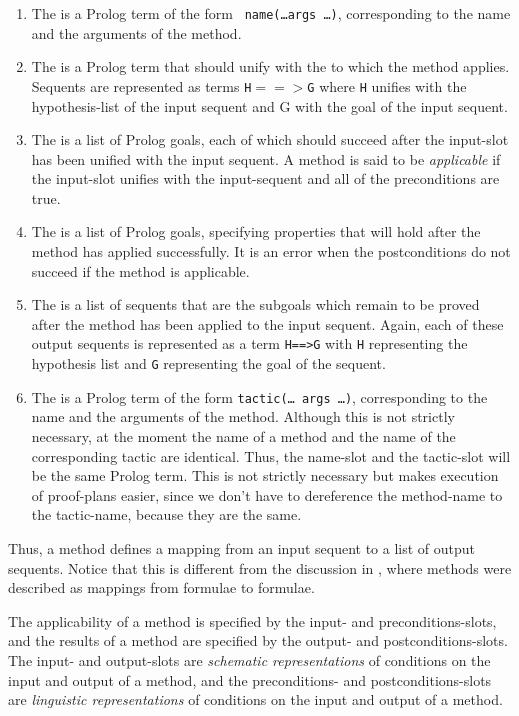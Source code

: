 \begin{enumerate}
\item
The {\em {}\/} is a Prolog term of the form {\tt
name(\ldots args \ldots)}, corresponding to the name and the arguments
of the method.
\item
The  is a Prolog term that should unify with the
 to which the method applies. Sequents are represented as
terms {\tt H$==>$G} where {\tt H} unifies with the hypothesis-list of
the input sequent and G with the goal of the input sequent.
\item
The  is a list of Prolog goals, each of which
should succeed after the input-slot has been unified with the input
sequent. A method is said to be {\em
applicable\/} if the input-slot
unifies with the input-sequent and all of the preconditions are true.
\item
The  is a list of Prolog goals, specifying
properties that will hold after the method has applied successfully.
It is an error when the postconditions do not succeed if the method is
applicable.
\item
The  is a list of sequents that are the subgoals
which remain to be proved after the method has been applied to the
input sequent. Again, each of these output sequents is represented as
a term {\tt H==>G} with {\tt H} representing the hypothesis list and
{\tt G} representing the goal of the sequent.
\item
The  is a Prolog term of the form {\tt tactic(\ldots
args \ldots)}, corresponding to the name and the arguments of the
method. Although this is not strictly necessary, at the moment the
name of a method and the name of the corresponding tactic are
identical. Thus, the name-slot and the tactic-slot will be the same
Prolog term. This is not strictly necessary but makes execution of
proof-plans easier, since we don't have to dereference the method-name
to the tactic-name, because they are the same.
\end{enumerate}

Thus, a method defines a mapping from an input sequent to a list of
output sequents. Notice that this is different from the discussion in
\cite{pub349}, where methods were described as mappings from formulae
to formulae.

 The applicability of a method is specified by
the input- and preconditions-slots, and the results of a method are
specified by the output- and postconditions-slots. The input- and
output-slots are {\em schematic representations\/} of conditions on
the input and output of a method, and the preconditions- and
postconditions-slots are {\em linguistic representations\/} of
conditions on the input and output of a method.

